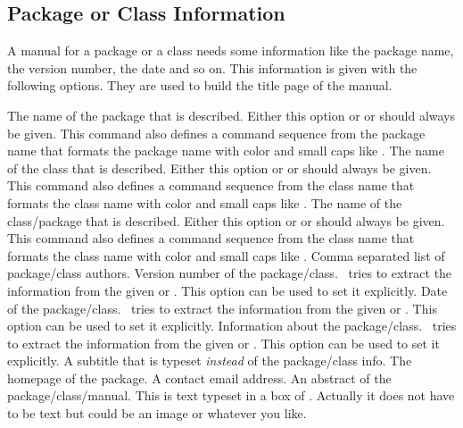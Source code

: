 \documentclass[load-preamble]{cnltx-doc}
\begin{document}
\subsection{Package or Class Information}
A manual for a package or a class needs some information like the package
name, the version number, the date and so on.  This information is given with
the following options.  They are used to build the title page of the manual.
\begin{options}
    The name of the package that is described.  Either this option or
     or  should always be given.  This command also
    defines a command sequence from the package name that formats the package
    name with color and small caps like \cnltx.
    The name of the class that is described.  Either this option or
     or  should always be given.  This command
    also defines a command sequence from the class name that formats the class
    name with color and small caps like \cnltx.
    The name of the class/package that is described.  Either this option or
     or  should always be given.  This command
    also defines a command sequence from the class name that formats the class
    name with color and small caps like \cnltx.
    Comma separated list of package/class authors.
    Version number of the package/class.  \cnltx\ tries to extract the
    information from the given  or .  This
    option can be used to set it explicitly.
    Date of the package/class.  \cnltx\ tries to extract the
    information from the given  or .  This
    option can be used to set it explicitly.
    Information about the package/class.  \cnltx\ tries to extract the
    information from the given  or .  This
    option can be used to set it explicitly.
    A subtitle that is typeset \emph{instead} of the package/class info.
    The homepage of the package.
    A contact email address.
    An abstract of the package/class/manual.  This is text typeset in a box of
    .  Actually it does not have to be text but could
      be an image or whatever you like.
\end{options}
\end{document}

